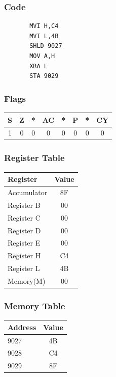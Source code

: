 \documentclass[]{report}
\begin{document}
\subsubsection{Code}
\begin{verbatim}
	   MVI H,C4
	   MVI L,4B
	   SHLD 9027
	   MOV A,H
	   XRA L
	   STA 9029
\end{verbatim}
\subsubsection{Flags}
\begin{tabular}{cccccccc}
\hline
    S & Z & *  & AC & *  & P & *  & CY  \\
    \hline
    1&0&0&0&0&0&0&0 \\
    \hline
\end{tabular}
\subsubsection {Register Table}
\begin{tabular}{lc}
    \hline
    Register & Value\\
    \hline
    Accumulator     & 8F        \\
    Register B      &  00        \\
    Register C      &  00        \\
    Register D      &   00       \\
    Register E      &   00       \\
    Register H      &  C4        \\
    Register L      &  4B         \\
    Memory(M)       &      00         \\
    \hline
\end{tabular}
\subsubsection {Memory Table}
\begin{tabular}{lc}
    \hline
    Address & Value  \\
    \hline
    9027 & 4B \\
    9028 & C4 \\
    9029 & 8F\\
    \hline
\end{tabular}
\end{document}
